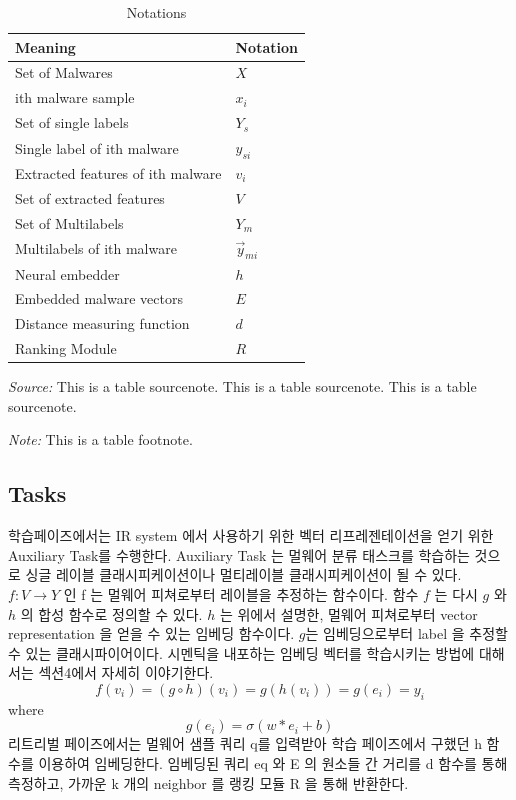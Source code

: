 \begin{table}%
\caption{Notations}
\label{tab:one}
\begin{minipage}{\columnwidth}
\begin{center}
\begin{tabular}{ll}
\toprule
Meaning & Notation\\
\midrule
  Set of Malwares     & $X$ \\
  ith malware sample  & $x_i$ \\
  Set of single labels & $Y_s$ \\
  Single label of ith malware    & $y_{si}$ \\
  Extracted features of ith malware & $v_i$ \\
  Set of extracted features   & $V$ \\
  Set of Multilabels   & $Y_m$ \\
  Multilabels of ith malware & $\vec{y}_{mi}$\\
  Neural embedder & $h$ \\
  Embedded malware vectors & $E$ \\
  Distance measuring function & $d$ \\
  Ranking Module & $R$\\
\bottomrule
\end{tabular}
\end{center}
\bigskip\centering
\footnotesize\emph{Source:} This is a table
 sourcenote. This is a table sourcenote. This is a table
 sourcenote.

 \emph{Note:} This is a table footnote.
\end{minipage}
\end{table}%


\subsection{Tasks}
학습페이즈에서는 IR system 에서 사용하기 위한 벡터 리프레젠테이션을 얻기 위한 Auxiliary Task를 수행한다. Auxiliary Task 는 멀웨어 분류 태스크를 학습하는 것으로 싱글 레이블 클래시피케이션이나 멀티레이블 클래시피케이션이 될 수 있다. $f: V \rightarrow Y $ 인 f 는 멀웨어 피쳐로부터 레이블을 추정하는 함수이다. 함수 $f$ 는 다시 $g$ 와 $h$ 의 합성 함수로 정의할 수 있다. $h$ 는 위에서 설명한, 멀웨어 피쳐로부터 vector representation 을 얻을 수 있는 임베딩 함수이다. $g$는 임베딩으로부터 label 을 추정할 수 있는 클래시파이어이다. 시멘틱을 내포하는 임베딩 벡터를 학습시키는 방법에 대해서는 섹션4에서 자세히 이야기한다. 
\[
f(v_i) = (g \circ h)(v_i) = g(h(v_i)) = g(e_i) = y_i 
\]
where
\[
g(e_i) = \sigma (w*e_i + b) 
\]
리트리벌 페이즈에서는 멀웨어 샘플 쿼리 q를 입력받아 학습 페이즈에서 구했던 h 함수를 이용하여 임베딩한다. 임베딩된 쿼리 eq 와 E 의 원소들 간 거리를 d 함수를 통해 측정하고, 가까운 k 개의 neighbor 를 랭킹 모듈 R 을 통해 반환한다. 

